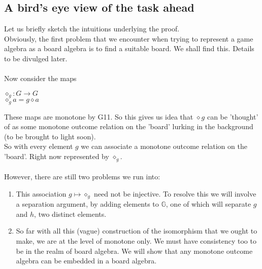 \documentclass[12pt]{article}
\begin{document}
\subsection{A bird's eye view of the task ahead}
Let us briefly sketch the intuitions underlying the proof. \\
Obviously, the first problem that we encounter when trying to represent a game algebra as a board algebra is to find a suitable board. We shall find this. Details to be divulged later. \\ \\
Now consider the maps \\
\begin{center}
   $\diamond_{g}: G \to G$ \\
   $\diamond_{g}a=g\diamond a$ \\
\end{center}
These maps are monotone by G11. So this gives us idea that $\diamond g$ can be 'thought' of as some monotone outcome relation on the 'board' lurking in the background (to be brought to light soon).\\
So with every element $g$ we can associate a monotone outcome relation on the 'board'. Right now represented by $\diamond_g$. \\ \\
However, there are still two problems we run into: 
\begin{enumerate}
    \item This association $g \mapsto\diamond_g$ need not be injective. To resolve this we will involve a separation argument, by adding elements to $\mathbb{G}$, one of which will separate $g$ and $h$, two distinct elements. 
    \item So far with all this (vague) construction of the isomorphism that we ought to make, we are at the level of monotone only. We must have consistency too to be in the realm of board algebra. We will show that any monotone outcome algebra can be embedded in a board algebra. 
\end{enumerate}
\end{document}
